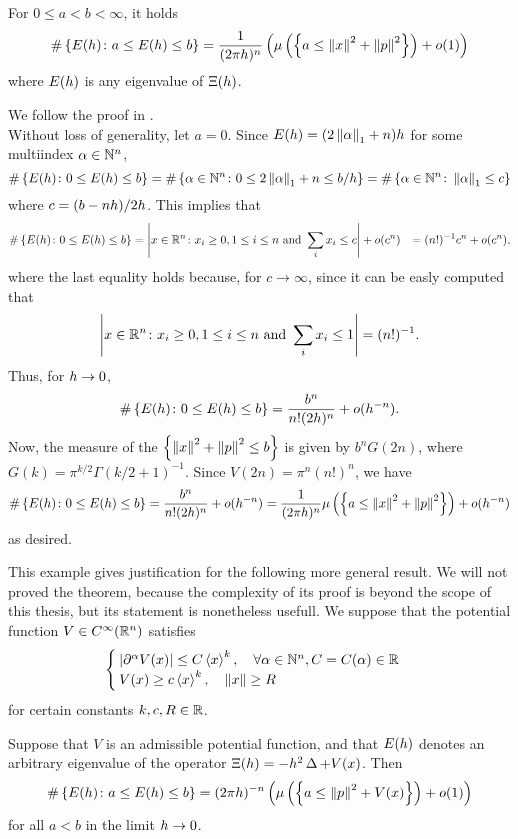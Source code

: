 \begin{nteo}
For $0\leq a< b<\infty$, it holds
\[
\#\left\{
E(h)\colon a\leq E(h)\leq b
\right\}=
\frac{1}{(2\pi h)^{n}}\left(\mu\left(
\left\{
a\leq\left\lVert x\right\rVert^{2}+\left\lVert p\right\rVert^{2}
\right\}
\right)
+o(1)\right)
\]
where $E(h)$ is any eigenvalue of $\Xi(h)$. 
\end{nteo} 
\begin{prf}
We follow the proof in \cite{Zworski:semic}.\\
Without loss of generality, let $a=0$. Since $E(h)=(2\left\lVert \alpha\right\rVert_{1}+n)h$ for some multiindex $\alpha\in\mathbb{N}^{n}$,
\[
\#\left\{
E(h)\colon 0\leq E(h)\leq b
\right\}=\#\left\{\alpha\in\mathbb{N}^{n}\colon 0\leq 2\left\lVert \alpha\right\rVert_{1}+n\leq b/h\right\}=\#\left\{\alpha\in\mathbb{N}^{n}\colon\left\lVert \alpha\right\rVert_{1}\leq c\right\}
\]
where $c=(b-nh)/2h$. This implies that 
\begin{align*}
\#\left\{
E(h)\colon 0\leq E(h)\leq b
\right\}&=\left| x\in\mathbb{R}^{n}\colon x_{i}\geq 0, 1\leq i\leq n\text{ and }\sum_{i}x_{i}\leq c\right|+o(c^{n})
&=(n!)^{-1}c^{n}+o(c^{n}), 
\end{align*}
where the last equality holds because, for $c\to\infty$, since it can be easly computed that 
\[
\left| x\in\mathbb{R}^{n}\colon x_{i}\geq 0, 1\leq i\leq n\text{ and }\sum_{i}x_{i}\leq 1\right|=(n!)^{-1}.
\]
Thus, for $h\to0$,
\[
\#\left\{
E(h)\colon 0\leq E(h)\leq b
\right\}=\frac{b^{n}}{n!(2h)^{n}}+o(h^{-n}).
\]
Now, the measure of the  $\left\{\left\lVert x\right\rVert^{2}+\left\lVert p\right\rVert^{2}\leq b\right\}$ is given by $b^{n}G(2n)$, where $G(k)=\pi^{k/2}\Gamma(k/2+1)^{-1}$. Since $V(2n)=\pi^{n}(n!)^{n}$, we have
\[
\#\left\{
E(h)\colon 0\leq E(h)\leq b
\right\}=\frac{b^{n}}{n!(2h)^{n}}+o(h^{-n})=\frac{1}{(2\pi h)^{n}}\mu\left(
\left\{
a\leq\left\lVert x\right\rVert^{2}+\left\lVert p\right\rVert^{2}
\right\}
\right)+o(h^{-n})
\]
as desired. 
\end{prf}

This example gives justification for the following more general result. We will not proved the theorem, because the complexity of its proof is beyond the scope of this thesis, but its statement is nonetheless usefull. We suppose that the potential function $V\in C^{\infty}(\mathbb{R}^{n})$ satisfies
\[
\begin{cases}
\left| \partial^{\alpha}V(x)\right|\leq C\left< x\right>^{k},\quad \forall\alpha\in\mathbb{N}^{n}, C=C(\alpha)\in\mathbb{R}\\
V(x)\geq c\left< x\right>^{k},\quad \left\lVert x\right\rVert\geq R
\end{cases}
\]
for certain constants $k,c,R\in\mathbb{R}$.
\begin{nteo}
\label{teo:weyl_law_euclid}
Suppose that $V$ is an admissible potential function, and that $E(h)$ denotes an arbitrary eigenvalue of the operator $\Xi(h)=-h^{2}\operatorname{\Delta}+V(x)$. Then
\[
\#\left\{
E(h)\colon a\leq E(h)\leq b
\right\}=(2\pi h)^{-n}\left(\mu\left(
\left\{
a\leq\left\lVert p\right\rVert^{2}+V(x)
\right\}
\right)
+o(1)\right)
\]
for all $a<b$ in the limit $h\to0$.
\end{nteo}

